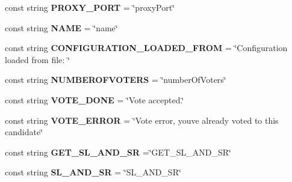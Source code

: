 \begin{DoxyCompactItemize}
\item 
\hypertarget{class_voter_1_1_constants_a26e4c49b1748e2459bfa93bc6c07c68c}{}const string {\bfseries P\+R\+O\+X\+Y\+\_\+\+P\+O\+R\+T} = \char`\"{}proxy\+Port\char`\"{}\label{class_voter_1_1_constants_a26e4c49b1748e2459bfa93bc6c07c68c}

\item 
\hypertarget{class_voter_1_1_constants_ac362590749ce5da2c365f00ef9fd57de}{}const string {\bfseries N\+A\+M\+E} = \char`\"{}name\char`\"{}\label{class_voter_1_1_constants_ac362590749ce5da2c365f00ef9fd57de}

\item 
\hypertarget{class_voter_1_1_constants_af3e0120d54451afd38934e1fc6f7e21a}{}const string {\bfseries C\+O\+N\+F\+I\+G\+U\+R\+A\+T\+I\+O\+N\+\_\+\+L\+O\+A\+D\+E\+D\+\_\+\+F\+R\+O\+M} = \char`\"{}Configuration loaded from file\+: \char`\"{}\label{class_voter_1_1_constants_af3e0120d54451afd38934e1fc6f7e21a}

\item 
\hypertarget{class_voter_1_1_constants_a5f1d3ba322703495f12c2fbc26c9942b}{}const string {\bfseries N\+U\+M\+B\+E\+R\+O\+F\+V\+O\+T\+E\+R\+S} = \char`\"{}number\+Of\+Voters\char`\"{}\label{class_voter_1_1_constants_a5f1d3ba322703495f12c2fbc26c9942b}

\item 
\hypertarget{class_voter_1_1_constants_a5ce65bad05048d9087a662b4683acd59}{}const string {\bfseries V\+O\+T\+E\+\_\+\+D\+O\+N\+E} = \char`\"{}Vote accepted.\char`\"{}\label{class_voter_1_1_constants_a5ce65bad05048d9087a662b4683acd59}

\item 
\hypertarget{class_voter_1_1_constants_a2e2460c4634ad8e396b2cd279020c529}{}const string {\bfseries V\+O\+T\+E\+\_\+\+E\+R\+R\+O\+R} = \char`\"{}Vote error, you\textquotesingle{}ve already voted to this candidate\char`\"{}\label{class_voter_1_1_constants_a2e2460c4634ad8e396b2cd279020c529}

\item 
\hypertarget{class_voter_1_1_constants_acac8430f469e7b12529c00c8efda4341}{}const string {\bfseries G\+E\+T\+\_\+\+S\+L\+\_\+\+A\+N\+D\+\_\+\+S\+R} =\char`\"{}G\+E\+T\+\_\+\+S\+L\+\_\+\+A\+N\+D\+\_\+\+S\+R\char`\"{}\label{class_voter_1_1_constants_acac8430f469e7b12529c00c8efda4341}

\item 
\hypertarget{class_voter_1_1_constants_a4fafecc9f9276a5720ab5d2e9d378983}{}const string {\bfseries S\+L\+\_\+\+A\+N\+D\+\_\+\+S\+R} = \char`\"{}S\+L\+\_\+\+A\+N\+D\+\_\+\+S\+R\char`\"{}\label{class_voter_1_1_constants_a4fafecc9f9276a5720ab5d2e9d378983}


\end{DoxyCompactItemize}
